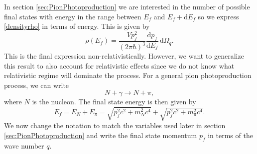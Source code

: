 In section \ref{sec:PionPhotoproduction} we are interested in the number of possible final states with energy in the range between $E_f$ and $E_f + \text{d}E_f$ so we express \eqref{densityrho} in terms of energy. This is given by
\begin{equation} \label{densityenergy}
	\rho(E_f) = \frac{V p_f^2}{(2\pi \hbar)^3} \frac{\text{d}p_f}{\text{d}E_f} \, \text{d}\Omega_q.
\end{equation}
This is the final expression non-relativistically. However, we want to generalize this result to also account for relativistic effects since we do not know what relativistic regime will dominate the process. For a general pion photoproduction process, we can write
\begin{equation} \label{twobody}
	N + \gamma \rightarrow N+\pi,
\end{equation}
where $N$ is the nucleon. The final state energy is then given by
\begin{equation} \label{Ef}
	E_f = E_N + E_\pi = \sqrt{p_f^2 c^2 +m_N^2c^4} + \sqrt{p_f^2c^2 + m^2_\pi c^4}.
\end{equation}
We now change the notation to match the variables used later in section \ref{sec:PionPhotoproduction} and write the final state momentum $p_f$ in terms of the wave number $q$. 


